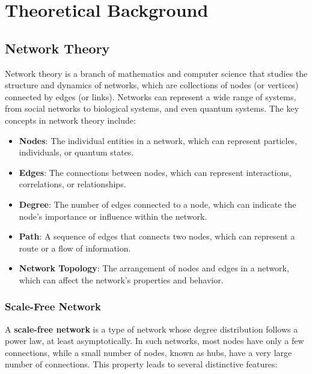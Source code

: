 \documentclass[a4paper, 11pt]{article}
\begin{document}
\section{Theoretical Background}
\subsection{Network Theory}
Network theory is a branch of mathematics and computer science that studies the structure and dynamics of networks, which are collections of nodes (or vertices) connected by edges (or links). Networks can represent a wide range of systems, from social networks to biological systems, and even quantum systems. The key concepts in network theory include:
\begin{itemize}
    \item \textbf{Nodes}: The individual entities in a network, which can represent particles, individuals, or quantum states.
    \item \textbf{Edges}: The connections between nodes, which can represent interactions, correlations, or relationships.
    \item \textbf{Degree}: The number of edges connected to a node, which can indicate the node's importance or influence within the network.
    \item \textbf{Path}: A sequence of edges that connects two nodes, which can represent a route or a flow of information.
    \item \textbf{Network Topology}: The arrangement of nodes and edges in a network, which can affect the network's properties and behavior.
\end{itemize}

\subsubsection{Scale-Free Network}
A \textbf{scale-free network} is a type of network whose degree distribution follows a power law, at least asymptotically. In such networks, most nodes have only a few connections, while a small number of nodes, known as hubs, have a very large number of connections. This property leads to several distinctive features:
\end{document}
